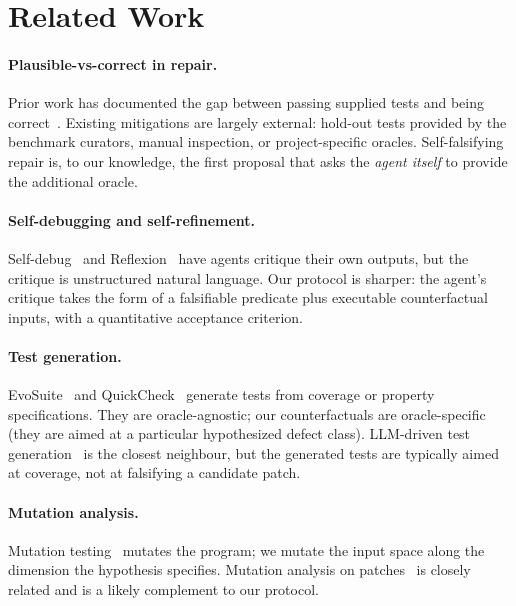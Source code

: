 \documentclass[sigconf,review,anonymous,nonacm]{acmart}
\begin{document}
\section{Related Work}
\label{sec:related}

\paragraph{Plausible-vs-correct in repair.} Prior work has documented
the gap between passing supplied tests and being
correct~\cite{qi2015analysis,smith2015cure,le2019reliability,liu2020efficacy}.
Existing mitigations are largely external: hold-out tests provided by
the benchmark curators, manual inspection, or project-specific
oracles. Self-falsifying repair is, to our knowledge, the first
proposal that asks the \emph{agent itself} to provide the additional
oracle.

\paragraph{Self-debugging and self-refinement.}
Self-debug~\cite{chen2023selfdebug} and
Reflexion~\cite{shinn2023reflexion} have agents critique their own
outputs, but the critique is unstructured natural language. Our
protocol is sharper: the agent's critique takes the form of a
falsifiable predicate plus executable counterfactual inputs, with a
quantitative acceptance criterion.

\paragraph{Test generation.} EvoSuite~\cite{fraser2011evosuite} and
QuickCheck~\cite{claessen2000quickcheck} generate tests from coverage
or property specifications. They are oracle-agnostic; our
counterfactuals are oracle-specific (they are aimed at a particular
hypothesized defect class). LLM-driven test
generation~\cite{schafer2024empirical} is the closest neighbour, but
the generated tests are typically aimed at coverage, not at
falsifying a candidate patch.

\paragraph{Mutation analysis.} Mutation
testing~\cite{papadakis2019mutation} mutates the program; we mutate
the input space along the dimension the hypothesis specifies.
Mutation analysis on patches~\cite{tian2020mutation} is closely
related and is a likely complement to our protocol.
\end{document}
